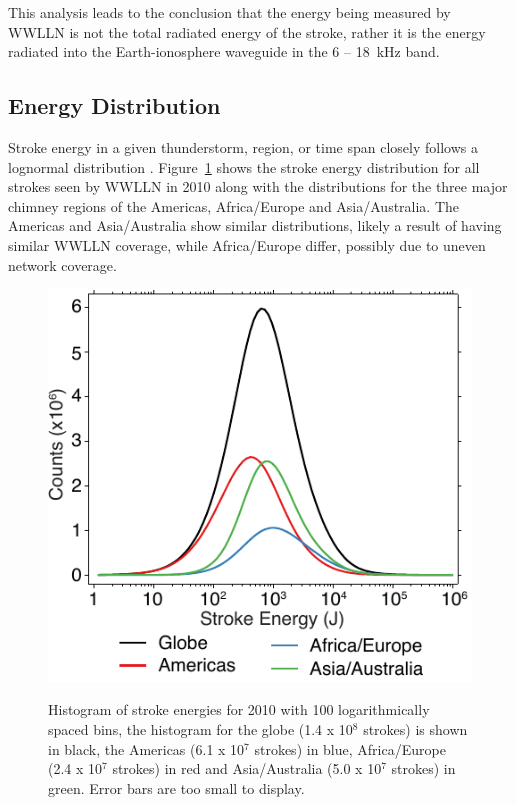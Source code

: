 This analysis leads to the conclusion that the energy being measured by WWLLN is not the total radiated energy of the stroke, rather it is the energy radiated into the Earth-ionosphere waveguide in the 6 -- 18~kHz band.

\subsection{Energy Distribution}

Stroke energy in a given thunderstorm, region, or time span closely follows a lognormal distribution \citep{Golde1977}.
Figure~\ref{energy:fig:distribution} shows the stroke energy distribution for all strokes seen by WWLLN in 2010 along with the distributions for the three major chimney regions of the Americas, Africa/Europe and Asia/Australia.
The Americas and Asia/Australia show similar distributions, likely a result of having similar WWLLN coverage, while Africa/Europe differ, possibly due to uneven network coverage.

\begin{figure}[ht!]
\centering
\includegraphics[scale=1]{energy/Figures/PPS_Distribution2.pdf}\\
\caption{Histogram of stroke energies for 2010 with 100 logarithmically spaced bins, the histogram for the globe (1.4 x 10$^8$ strokes) is shown in black, the Americas (6.1 x 10$^7$ strokes) in blue, Africa/Europe (2.4 x 10$^7$ strokes) in red and Asia/Australia (5.0 x 10$^7$ strokes) in green. Error bars are too small to display.}
\label{energy:fig:distribution}
\end{figure}
 
